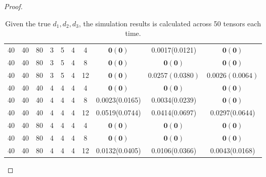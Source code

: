 \documentclass{article}
\newtheorem{proof}{Proof}
\begin{document}
\begin{appendices}
\begin{proof}
\begin{table}[http]
\begin{tabular}{|c|c|c|c|c|c|c|c|c|c|}
		40&40&80&3&5&4&4&$\mathbf{0(0)}$&0.0017(0.0121)&$\mathbf{0(0)}$\\
		40&40&80&3&5&4&8&$\mathbf{0(0)}$&$\mathbf{0(0)}$&$\mathbf{0(0)}$\\
		40&40&80&3&5&4&12&$\mathbf{0(0)}$&$0.0257(0.0380)$&$0.0026(0.0064)$\\

		40&40&40&4&4&4&4&$\mathbf{0(0)}$&$\mathbf{0(0)}$&$\mathbf{0(0)}$\\
		40&40&40&4&4&4&8&0.0023(0.0165)&0.0034(0.0239)&$\mathbf{0(0)}$\\
		40&40&40&4&4&4&12&0.0519(0.0744)&0.0414(0.0697)&0.0297(0.0644)\\
		
		40&40&80&4&4&4&4&$\mathbf{0(0)}$&$\mathbf{0(0)}$&$\mathbf{0(0)}$\\
		40&40&80&4&4&4&8&$\mathbf{0(0)}$&$\mathbf{0(0)}$&$\mathbf{0(0)}$\\
		40&40&80&4&4&4&12&0.0132(0.0405)&0.0106(0.0366)&0.0043(0.0168) \\
		\hline
	\end{tabular}
	\caption{Given the true $d_1,d_2,d_3$, the simulation results is calculated across 50 tensors each time. }
	\label{t1}
\end{table}




\end{proof}
\end{appendices}
\end{document}
